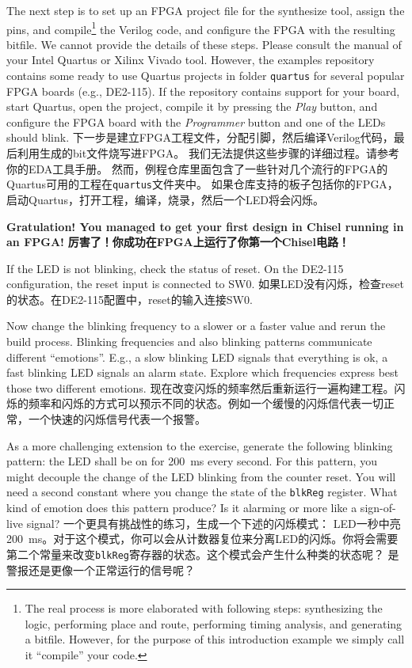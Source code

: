\documentclass[%
    10pt,
    headinclude, footexclude,
    openright, %
    notitlepage,
    cleardoubleempty,
    headsepline,
    pointlessnumbers,
    bibtotoc, idxtotoc,
    ]{scrbook}
\newcommand{\code}[1]{{\small{\texttt{#1}}}}
\begin{document}
The next step is to set up an FPGA project file for the synthesize tool, assign the pins,
and compile\footnote{The real process is more elaborated with following steps: synthesizing the logic,
performing place and route, performing timing analysis, and generating a bitfile.
However, for the purpose of this introduction example we simply call it ``compile''
your code.} the Verilog code, and configure the FPGA with the resulting bitfile.
We cannot provide the details of these steps. Please consult the manual of
your Intel Quartus or Xilinx Vivado tool.
However, the examples repository contains some ready to use Quartus
projects in folder \code{quartus} for several popular FPGA boards (e.g., DE2-115).
If the repository contains support for your board, start Quartus, open the project,
compile it by pressing the \emph{Play} button, and configure the FPGA board
with the \emph{Programmer} button and one of the LEDs should blink.
下一步是建立FPGA工程文件，分配引脚，然后编译Verilog代码，最后利用生成的bit文件烧写进FPGA。
我们无法提供这些步骤的详细过程。请参考你的EDA工具手册。
然而，例程仓库里面包含了一些针对几个流行的FPGA的Quartus可用的工程在\code{quartus}文件夹中。
如果仓库支持的板子包括你的FPGA，启动Quartus，打开工程，编译，烧录，然后一个LED将会闪烁。

{\bf Gratulation! You managed to get your first design in Chisel running in an FPGA!}
{\bf 厉害了！你成功在FPGA上运行了你第一个Chisel电路！}

If the LED is not blinking, check the status of reset. On the DE2-115 configuration,
the reset input is connected to SW0.
如果LED没有闪烁，检查reset的状态。在DE2-115配置中，reset的输入连接SW0.

Now change the blinking frequency to a slower or a faster value and
rerun the build process. Blinking frequencies and also blinking patterns
communicate different ``emotions''. E.g., a slow blinking LED signals that
everything is ok, a fast blinking LED signals an alarm state.
Explore which frequencies express best those two different emotions.
现在改变闪烁的频率然后重新运行一遍构建工程。闪烁的频率和闪烁的方式可以预示不同的状态。例如一个缓慢的闪烁信代表一切正常，一个快速的闪烁信号代表一个报警。

As a more challenging extension to the exercise, generate the following blinking pattern:
the LED shall be on for 200~ms every second. For this pattern, you might
decouple the change of the LED blinking from the counter reset.
You will need a second constant where you change the state of the
\code{blkReg} register. What kind of emotion does this pattern produce?
Is it alarming or more like a sign-of-live signal?
一个更具有挑战性的练习，生成一个下述的闪烁模式：
LED一秒中亮200~ms。对于这个模式，你可以会从计数器复位来分离LED的闪烁。你将会需要第二个常量来改变\code{blkReg}寄存器的状态。这个模式会产生什么种类的状态呢？
是警报还是更像一个正常运行的信号呢？
\end{document}

